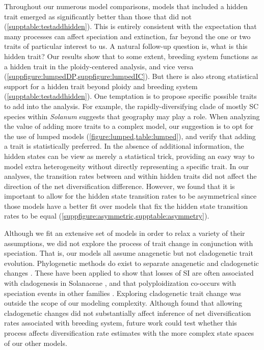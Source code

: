 Throughout our numerous model comparisons, models that included a hidden trait emerged as significantly better than those that did not (\cref{supptable:testaddhidden}). 
This is entirely consistent with the expectation that many processes can affect speciation and extinction, far beyond the one or two traits of particular interest to us.
A natural follow-up question is, what is this hidden trait?
Our results show that to some extent, breeding system functions as a hidden trait in the ploidy-centered analysis, and vice versa (\cref{suppfigure:lumpedDP,suppfigure:lumpedIC}).
But there is also strong statistical support for a hidden trait beyond ploidy and breeding system (\cref{supptable:testaddhidden}).
One temptation is to propose specific possible traits to add into the analysis.
For example, the rapidly-diversifying clade of mostly SC species within \emph{Solanum} suggests that geography may play a role. %
When analyzing the value of adding more traits to a complex model, our suggestion is to opt for the use of lumped models (\cref{figure:lumped,table:lumped}), and verify that adding a trait is statistically preferred.
In the absence of additional information, the hidden states can be view as merely a statistical trick, providing an easy way to model extra heterogeneity without directly representing a specific trait.
In our analyses, the transition rates between and within hidden traits did not affect the direction of the net diversification difference. However, we found that it is important to allow for the hidden state transition rates to be asymmetrical since those models have a better fit over models that fix the hidden state transition rates to be equal (\cref{suppfigure:asymmetric,supptable:asymmetry}).

Although we fit an extensive set of models in order to relax a variety of their assumptions, we did not explore the process of trait change in conjunction with speciation.
That is, our models all assume anagenetic but not cladogenetic trait evolution.
Phylogenetic methods do exist to separate anagenetic and cladogenetic changes \citep{mayrose_2011, goldberg_2012, magnuson-ford_2012}.
These have been applied to show that losses of SI are often associated with cladogenesis in Solanaceae \citep{goldberg_2012}, and that polyploidization co-occurs with speciation events in other families \citep{zhan_2016, freyman_2017}.
Exploring cladogenetic trait change was outside the scope of our modeling complexity.
Although \citet{goldberg_2012} found that allowing cladogenetic changes did not substantially affect inference of net diversification rates associated with breeding system, future work could test whether this process affects diversification rate estimates with the more complex state spaces of our other models.

